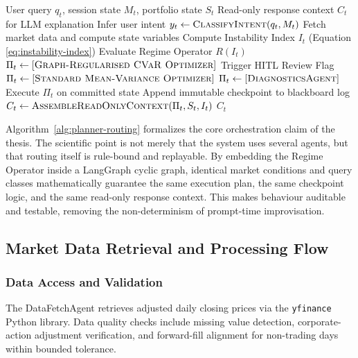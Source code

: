 \documentclass[11pt]{article}
\begin{document}
\begin{algorithm}[htbp]
\caption{LangGraph-Guided Deterministic Orchestration}
\label{alg:planner-routing}
\begin{algorithmic}[1]
\Require User query $q_t$, session state $M_t$, portfolio state $S_t$
\Ensure Read-only response context $C_t$ for LLM explanation
\State Infer user intent $y_t \leftarrow \textsc{ClassifyIntent}(q_t, M_t)$
\State Fetch market data and compute state variables
    \State Compute Instability Index $I_t$ (Equation \ref{eq:instability-index})
    \State Evaluate Regime Operator $R(I_t)$
        \State $\Pi_t \leftarrow [\textsc{Graph-Regularised CVaR Optimizer}]$
        \State Trigger HITL Review Flag
    \Else
        \State $\Pi_t \leftarrow [\textsc{Standard Mean-Variance Optimizer}]$
    \EndIf
{}
    \State $\Pi_t \leftarrow [\textsc{DiagnosticsAgent}]$
\EndIf
\State Execute $\Pi_t$ on committed state
\State Append immutable checkpoint to blackboard log
\State $C_t \leftarrow \textsc{AssembleReadOnlyContext}(\Pi_t, S_t, I_t)$
\State \Return $C_t$
\end{algorithmic}
\end{algorithm}

Algorithm~\ref{alg:planner-routing} formalizes the core orchestration claim of the thesis. The scientific point is not merely that the system uses several agents, but that routing itself is rule-bound and replayable. By embedding the Regime Operator inside a LangGraph cyclic graph, identical market conditions and query classes mathematically guarantee the same execution plan, the same checkpoint logic, and the same read-only response context. This makes behaviour auditable and testable, removing the non-determinism of prompt-time improvisation.

\subsection{Market Data Retrieval and Processing Flow}
\label{sec:data_flow}

\subsubsection{Data Access and Validation}

The DataFetchAgent retrieves adjusted daily closing prices via the \texttt{yfinance} Python library. Data quality checks include missing value detection, corporate-action adjustment verification, and forward-fill alignment for non-trading days within bounded tolerance.
\end{document}
